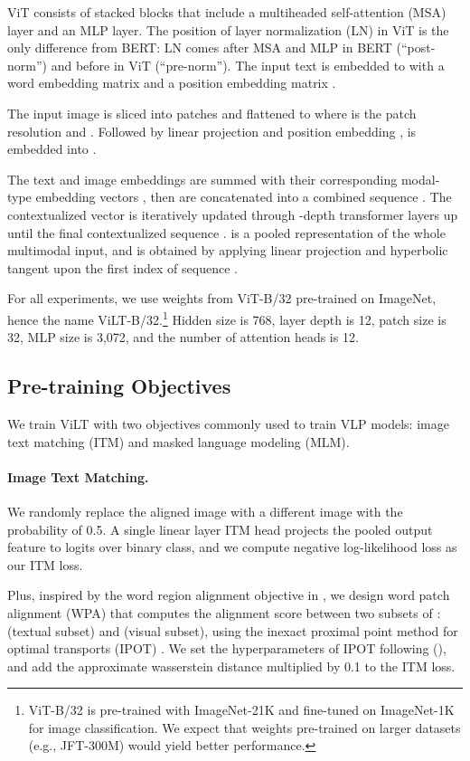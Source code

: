\documentclass{article}
\begin{document}
ViT consists of stacked blocks that include a multiheaded self-attention (MSA) layer and an MLP layer. The position of layer normalization (LN) in ViT is the only difference from BERT: LN comes after MSA and MLP in BERT (``post-norm'') and before in ViT (``pre-norm'').
The input text  is embedded to  with a word embedding matrix  and a position embedding matrix .

The input image  is sliced into patches and flattened to  where  is the patch resolution and . Followed by linear projection  and position embedding ,  is embedded into .

The text and image embeddings are summed with their corresponding modal-type embedding vectors , then are concatenated into a combined sequence . The contextualized vector  is iteratively updated through -depth transformer layers up until the final contextualized sequence .  is a pooled representation of the whole multimodal input, and is obtained by applying linear projection  and hyperbolic tangent upon the first index of sequence .

For all experiments, we use weights from ViT-B/32 pre-trained on ImageNet, hence the name ViLT-B/32.\footnote{ViT-B/32 is pre-trained with ImageNet-21K and fine-tuned on ImageNet-1K for image classification. We expect that weights pre-trained on larger datasets (e.g., JFT-300M) would yield better performance.}
Hidden size  is 768, layer depth  is 12, patch size  is 32, MLP size is 3,072, and the number of attention heads is 12.

\subsection{Pre-training Objectives}
We train ViLT with two objectives commonly used to train VLP models: image text matching (ITM) and masked language modeling (MLM).

\paragraph{Image Text Matching.}
We randomly replace the aligned image with a different image with the probability of 0.5.
A single linear layer ITM head projects the pooled output feature  to logits over binary class, and we compute negative log-likelihood loss as our ITM loss.

Plus, inspired by the word region alignment objective in \citet{chen2019uniter}, we design word patch alignment (WPA) that computes the alignment score between two subsets of :  (textual subset) and  (visual subset), using the inexact proximal point method for optimal transports (IPOT) \citep{xie2020fast}.
We set the hyperparameters of IPOT following \citet{chen2019uniter} (), and add the approximate wasserstein distance multiplied by 0.1 to the ITM loss.
\end{document}

